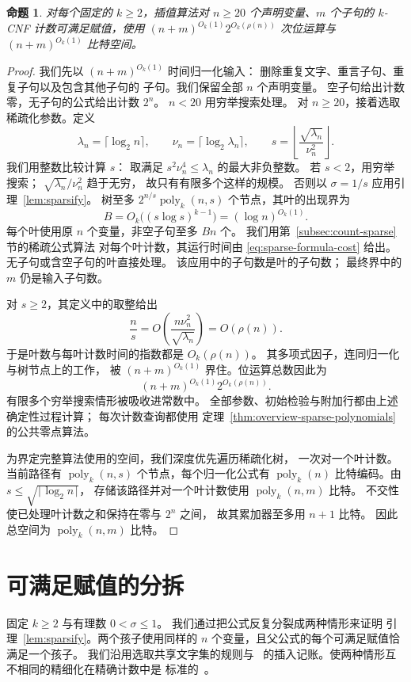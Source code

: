 \documentclass[11pt,reqno]{amsart}
\numberwithin{equation}{section}
\newtheorem{proposition}[theorem]{命题}
\theoremstyle{definition}\newtheorem{definition}[theorem]{定义}
\theoremstyle{remark}\newtheorem{remark}[theorem]{注}
\newcommand{\poly}{\operatorname{poly}}
\renewcommand{\le}{\leqslant}
\renewcommand{\ge}{\geqslant}
\begin{document}
\begin{proposition}\label{prop:interpolation-bound}
对每个固定的 $k\ge2$，插值算法对 $n\ge20$
个声明变量、$m$ 个子句的 $k$-CNF
计数可满足赋值，使用 $(n+m)^{O_k(1)}2^{O_k(\rho(n))}$
次位运算与 $(n+m)^{O_k(1)}$ 比特空间。
\end{proposition}
\begin{proof}
我们先以 $(n+m)^{O_k(1)}$ 时间归一化输入：
删除重复文字、重言子句、重复子句以及包含其他子句的
子句。我们保留全部 $n$ 个声明变量。
空子句给出计数零，无子句的公式给出计数 $2^n$。
$n<20$ 用穷举搜索处理。
对 $n\ge20$，接着选取稀疏化参数。定义
\[
 \lambda_n=\lceil\log_2 n\rceil,\qquad
 \nu_n=\lceil\log_2\lambda_n\rceil,\qquad
 s=\left\lfloor\frac{\sqrt{\lambda_n}}{\nu_n^2}\right\rfloor.
\]
我们用整数比较计算 $s$：
取满足 $s^2\nu_n^4\le\lambda_n$ 的最大非负整数。
若 $s<2$，用穷举搜索；
$\sqrt{\lambda_n}/\nu_n^2$ 趋于无穷，
故只有有限多个这样的规模。
否则以 $\sigma=1/s$ 应用引理~\ref{lem:sparsify}。
树至多 $2^{n/s}\operatorname{poly}_k(n,s)$
个节点，其叶的出现界为
\[
 B=O_k\bigl((s\log s)^{k-1}\bigr)=(\log n)^{O_k(1)}.
\]
每个叶使用原 $n$ 个变量，非空子句至多 $Bn$ 个。
我们用第~\ref{subsec:count-sparse} 节的稀疏公式算法
对每个叶计数，其运行时间由
\eqref{eq:sparse-formula-cost} 给出。
无子句或含空子句的叶直接处理。
该应用中的子句数是叶的子句数；
最终界中的 $m$ 仍是输入子句数。

对 $s\ge2$，其定义中的取整给出
\[
 \frac ns=O\!\left(\frac{n\nu_n^2}{\sqrt{\lambda_n}}\right)
 =O(\rho(n)).
\]
于是叶数与每叶计数时间的指数都是 $O_k(\rho(n))$。
其多项式因子，连同归一化与树节点上的工作，
被 $(n+m)^{O_k(1)}$ 界住。位运算总数因此为
\[
 (n+m)^{O_k(1)}2^{O_k(\rho(n))}.
\]
有限多个穷举搜索情形被吸收进常数中。
全部参数、初始检验与附加行都由上述确定性过程计算；
每次计数查询都使用
定理~\ref{thm:overview-sparse-polynomials}
的公共零点算法。

为界定完整算法使用的空间，我们深度优先遍历稀疏化树，
一次对一个叶计数。当前路径有 $\poly_k(n,s)$
个节点，每个归一化公式有 $\poly_k(n)$
比特编码。由 $s\le\sqrt{\lceil\log_2 n\rceil}$，
存储该路径并对一个叶计数使用 $\poly_k(n,m)$ 比特。
不交性使已处理叶计数之和保持在零与 $2^n$ 之间，
故其累加器至多用 $n+1$ 比特。
因此总空间为 $\poly_k(n,m)$ 比特。
\end{proof}

\appendix
\section{可满足赋值的分拆}\label{app:sparsify}

固定 $k\ge2$ 与有理数 $0<\sigma\le1$。
我们通过把公式反复分裂成两种情形来证明
引理~\ref{lem:sparsify}。两个孩子使用同样的 $n$
个变量，且父公式的每个可满足赋值恰满足一个孩子。
我们沿用选取共享文字集的规则与~\cite[Section~6]{CIP}
的插入记账。使两种情形互不相同的精细化在精确计数中是
标准的~\cite[Appendix~A]{DHMTW}。
\end{document}
